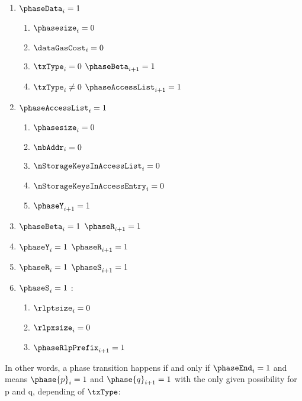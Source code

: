 \begin{enumerate}[resume]
\begin{enumerate}
            \item \If $\phaseData_{i} = 1$ \Then 
                \begin{enumerate}
                    \item \trash $\phasesize_{i} = 0$
                    \item $\dataGasCost_{i} = 0$
                    \item \If $\txType_{i} = 0$ \Then $\phaseBeta_{i + 1} = 1$
                    \item \If $\txType_{i} \neq 0$ \Then $\phaseAccessList_{i + 1} = 1$
                \end{enumerate}
            \item \If $\phaseAccessList_{i} = 1$ \Then 
                \begin{enumerate}
                    \item \trash $\phasesize_{i} = 0$
                    \item $\nbAddr_{i} = 0$
                    \item $\nStorageKeysInAccessList_{i} = 0$
                    \item $\nStorageKeysInAccessEntry_{i} = 0$
                    \item $\phaseY_{i + 1} = 1$
                \end{enumerate}
            \item \If $\phaseBeta_{i} = 1$ \Then $\phaseR_{i + 1} = 1$
            \item \If $\phaseY_{i} = 1$ \Then $\phaseR_{i + 1} = 1$
            \item \If $\phaseR_{i} = 1$ \Then $\phaseS_{i + 1} = 1$
            \item \If $\phaseS_{i} = 1$ \Then:
                \begin{enumerate}
                    \item $\rlptsize_{i} = 0$
                    \item $\rlpxsize_{i} = 0$
                    \item $\phaseRlpPrefix_{i + 1} = 1$
                \end{enumerate}
        \end{enumerate}
\end{enumerate}

In other words, a phase transition happens if and only if $\phaseEnd_{i} = 1$ and means $\phase{p}_{i} = 1$ and $\phase{q}_{i + 1} = 1$ with the only given possibility for p and q, depending of $\txType$: 

